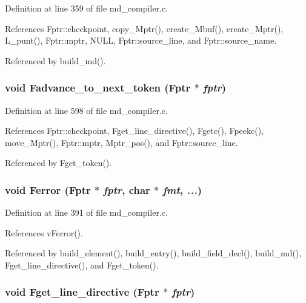 Definition at line 359 of file md\_\-compiler.c.

References Fptr::checkpoint, copy\_\-Mptr(), create\_\-Mbuf(), create\_\-Mptr(), L\_\-punt(), Fptr::mptr, NULL, Fptr::source\_\-line, and Fptr::source\_\-name.

Referenced by build\_\-md().
\subsubsection{\setlength{\rightskip}{0pt plus 5cm}void Fadvance\_\-to\_\-next\_\-token (\bf{Fptr} $\ast$ {\em fptr})}\label{md__compiler_8c_de728546c62e9c27434f5e16b9581308}




Definition at line 598 of file md\_\-compiler.c.

References Fptr::checkpoint, Fget\_\-line\_\-directive(), Fgetc(), Fpeekc(), move\_\-Mptr(), Fptr::mptr, Mptr\_\-pos(), and Fptr::source\_\-line.

Referenced by Fget\_\-token().
\subsubsection{\setlength{\rightskip}{0pt plus 5cm}void Ferror (\bf{Fptr} $\ast$ {\em fptr}, char $\ast$ {\em fmt},  {\em ...})}\label{md__compiler_8c_761c4386743ac261985b813ab1a8040c}




Definition at line 391 of file md\_\-compiler.c.

References v\-Ferror().

Referenced by build\_\-element(), build\_\-entry(), build\_\-field\_\-decl(), build\_\-md(), Fget\_\-line\_\-directive(), and Fget\_\-token().
\subsubsection{\setlength{\rightskip}{0pt plus 5cm}void Fget\_\-line\_\-directive (\bf{Fptr} $\ast$ {\em fptr})}\label{md__compiler_8c_95ddff2b06b579672c573d2ec46808de}




